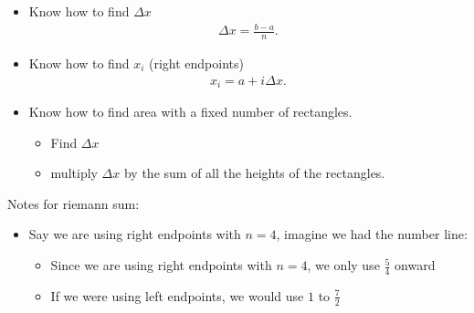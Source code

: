 \documentclass{report}
\begin{document}
     \bigbreak \noindent 
     \bigbreak \noindent 
     \begin{itemize}
       \item Know how to find $\Delta x$
         \begin{align*}
           \Delta x = \frac{b-a}{n}
         .\end{align*}
        \item Know how to find $x_i$ (right endpoints)
          \begin{align*}
            x_{i} = a + i \Delta x
          .\end{align*}
        \item Know how to find area with a fixed number of rectangles.
          \begin{itemize}
            \item Find $\Delta x $
            \item multiply $\Delta x$ by the sum of all the heights of the rectangles.
          \end{itemize}
     \end{itemize}
     \bigbreak \noindent \bigbreak \noindent
     Notes for riemann sum:
     \begin{itemize}
       \item Say we are using right endpoints with $n=4$, imagine we had the number line:
      \begin{figure}[ht]
          \centering
          \label{fig:nlinettt}
      \end{figure}
      \begin{itemize}
        \item Since we are using right endpoints with $n=4$, we only use $\frac{5}{4}$ onward
        \item If we were using left endpoints, we would use $1$ to $\frac{7}{2}$
      \end{itemize}
       \end{itemize}


     \bigbreak \noindent \bigbreak \noindent 
\end{document}
